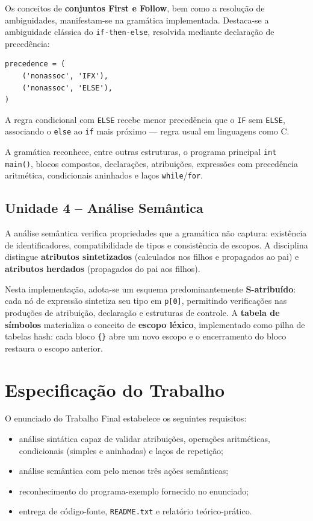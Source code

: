 \documentclass[12pt,a4paper]{article}
\begin{document}
Os conceitos de \textbf{conjuntos First e Follow}, bem como a resolução de ambiguidades,
manifestam-se na gramática implementada. Destaca-se a ambiguidade clássica do
\texttt{if-then-else}, resolvida mediante declaração de precedência:

\begin{lstlisting}[style=gramatica]
precedence = (
    ('nonassoc', 'IFX'),
    ('nonassoc', 'ELSE'),
)
\end{lstlisting}

A regra condicional com \texttt{ELSE} recebe menor precedência que o \texttt{IF}
sem \texttt{ELSE}, associando o \texttt{else} ao \texttt{if} mais próximo --- regra
usual em linguagens como C.

A gramática reconhece, entre outras estruturas, o programa principal
\texttt{int main()}, blocos compostos, declarações, atribuições, expressões com
precedência aritmética, condicionais aninhados e laços \texttt{while}/\texttt{for}.

\subsection{Unidade 4 -- Análise Semântica}

A análise semântica verifica propriedades que a gramática não captura: existência
de identificadores, compatibilidade de tipos e consistência de escopos. A disciplina
distingue \textbf{atributos sintetizados} (calculados nos filhos e propagados ao pai)
e \textbf{atributos herdados} (propagados do pai aos filhos).

Nesta implementação, adota-se um esquema predominantemente \textbf{S-atribuído}:
cada nó de expressão sintetiza seu tipo em \texttt{p[0]}, permitindo verificações nas
produções de atribuição, declaração e estruturas de controle. A \textbf{tabela de
símbolos} materializa o conceito de \textbf{escopo léxico}, implementado como pilha de
tabelas hash: cada bloco \texttt{\{\}} abre um novo escopo e o encerramento do bloco
restaura o escopo anterior.

\section{Especificação do Trabalho}

O enunciado do Trabalho Final estabelece os seguintes requisitos:

\begin{itemize}
  \item análise sintática capaz de validar atribuições, operações aritméticas,
        condicionais (simples e aninhadas) e laços de repetição;
  \item análise semântica com pelo menos três ações semânticas;
  \item reconhecimento do programa-exemplo fornecido no enunciado;
  \item entrega de código-fonte, \texttt{README.txt} e relatório teórico-prático.
\end{itemize}
\end{document}

